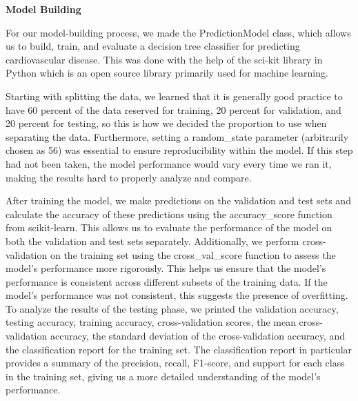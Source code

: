 ﻿\documentclass[12pt]{article}
\begin{document}
\vspace{5mm}

\textbf{Model Building}

For our model-building process, we made the PredictionModel class, which allows us to build, train, and evaluate a decision tree classifier for predicting cardiovascular disease. This was done with the help of the sci-kit library in Python which is an open source library primarily used for machine learning. 

Starting with splitting the data, we learned that it is generally good practice to have 60 percent of the data reserved for training, 20 percent for validation, and 20 percent for testing, so this is how we decided the proportion to use when separating the data. Furthermore, setting a random\_state parameter (arbitrarily chosen as 56) was essential to ensure reproducibility within the model. If this step had not been taken, the model performance would vary every time we ran it, making the results hard to properly analyze and compare. 

After training the model, we make predictions on the validation and test sets and calculate the accuracy of these predictions using the accuracy\_score function from scikit-learn. This allows us to evaluate the performance of the model on both the validation and test sets separately. Additionally, we perform cross-validation on the training set using the cross\_val\_score function to assess the model's performance more rigorously. This helps us ensure that the model's performance is consistent across different subsets of the training data. If the model’s performance was not consistent, this suggests the presence of overfitting. To analyze the results of the testing phase, we printed the validation accuracy, testing accuracy, training accuracy, cross-validation scores, the mean cross-validation accuracy, the standard deviation of the cross-validation accuracy, and the classification report for the training set. The classification report in particular provides a summary of the precision, recall, F1-score, and support for each class in the training set, giving us a more detailed understanding of the model's performance.
\end{document}
